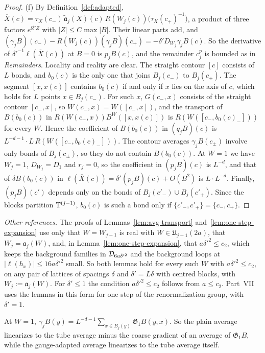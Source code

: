 \begin{proof}
(f) By Definition~\ref{def:adapted}, $\overline X(c)=\tau_X(c_-)\,\tilde{\mathfrak a}_j(X)(c)\,R(W_j(c))\big(\tau_X(c_+)^{-1}\big)$, a product of three factors $e^{\ii\delta'Z}$ with $|Z|\le C\max|B|$. Their linear parts add, and $(\gamma_jB)(c_-)-R(W_j(c))(\gamma_jB)(c_+)=-\delta'D_{W_j}\gamma_jB(c)$. So the derivative of $\delta'^{-1}\ell(\overline X(c))$ at $B=0$ is $p_jB(c)$, and the remainder $c^p_j$ is bounded as in \emph{Remainders}. Locality and reality are clear. The straight contour $[c]$ consists of $L$ bonds, and $b_0(c)$ is the only one that joins $B_j(c_-)$ to $B_j(c_+)$. The segment $[x,x(c)]$ contains $b_0(c)$ if and only if $x$ lies on the axis of $c$, which holds for $L$ points $x\in B_j(c_-)$. For such $x$, $G(c_-,x)$ consists of the straight contour $[c_-,x]$, so $W(c_-,x)=W([c_-,x])$, and the transport of $B(b_0(c))$ in $R(W(c_-,x))B^W([x,x(c)])$ is $R(W([c_-,b_0(c)_-]))$ for every $W$. Hence the coefficient of $B(b_0(c))$ in $(q_jB)(c)$ is $L^{-d-1}\cdot L\,R(W([c_-,b_0(c)_-]))$. The contour averages $\gamma_jB(c_\pm)$ involve only bonds of $B_j(c_\pm)$, so they do not contain $B(b_0(c))$. At $W=1$ we have $W_j=1$, $D_{W_j}=D_1$ and $r_j=0$, so the coefficient in $(p_jB)(c)$ is $L^{-d}$, and that of $\delta B(b_0(c))$ in $\ell(\overline X(c))=\delta'(p_jB)(c)+O(B^2)$ is $L\cdot L^{-d}$. Finally, $(p_jB)(c')$ depends only on the bonds of $B_j(c'_-)\cup B_j(c'_+)$. Since the blocks partition $\mathbb T^{(j-1)}$, $b_0(c)$ is such a bond only if $\{c'_-,c'_+\}=\{c_-,c_+\}$.
\end{proof}

\emph{Other references.} The proofs of Lemmas~\ref{lem:avg-transport} and~\ref{lem:one-step-expansion} use only that $W=W_{j-1}$ is real with $W\in\mathfrak U_{j-1}(2a)$, that $W_j=\mathfrak a_j(W)$, and, in Lemma~\ref{lem:one-step-expansion}, that $a\delta'^2\le c_2$, which keeps the background families in $\mathcal D_{6a\delta'^2}$ and the background loops at $|\ell(h_x)|\le16a\delta'^2$ small. So both lemmas hold for every such $W$ with $a\delta'^2\le c_2$, on any pair of lattices of spacings $\delta$ and $\delta'=L\delta$ with centred blocks, with $W_j:=\mathfrak a_j(W)$. For $\delta'\le1$ the condition $a\delta'^2\le c_2$ follows from $a\le c_2$. Part~VII uses the lemmas in this form for one step of the renormalization group, with $\delta'=1$.

At $W=1$, $\gamma_jB(y)=L^{-d-1}\sum_{x\in B_j(y)}\mathfrak G_1B(y,x)$. So the plain average linearizes to the tube average minus the coarse gradient of an average of $\mathfrak G_1B$, while the gauge-adapted average linearizes to the tube average itself.

